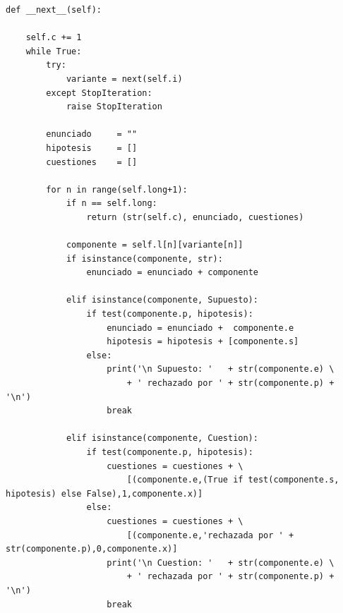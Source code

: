 \documentclass[10pt,a4paper]{report}
\begin{document}
\begin{verbatim}
def __next__(self):
    
    self.c += 1
    while True:
        try:
            variante = next(self.i)
        except StopIteration:
            raise StopIteration

        enunciado     = ""
        hipotesis     = []
        cuestiones    = []
                     
        for n in range(self.long+1):
            if n == self.long:
                return (str(self.c), enunciado, cuestiones)
    
            componente = self.l[n][variante[n]]
            if isinstance(componente, str):
                enunciado = enunciado + componente
                
            elif isinstance(componente, Supuesto):
                if test(componente.p, hipotesis):
                    enunciado = enunciado +  componente.e
                    hipotesis = hipotesis + [componente.s]
                else:
                    print('\n Supuesto: '   + str(componente.e) \
                        + ' rechazado por ' + str(componente.p) + '\n')
                    break
                
            elif isinstance(componente, Cuestion):
                if test(componente.p, hipotesis):
                    cuestiones = cuestiones + \
                        [(componente.e,(True if test(componente.s, hipotesis) else False),1,componente.x)]
                else:
                    cuestiones = cuestiones + \
                        [(componente.e,'rechazada por ' + str(componente.p),0,componente.x)]
                    print('\n Cuestion: '   + str(componente.e) \
                        + ' rechazada por ' + str(componente.p) + '\n')
                    break
\end{verbatim}
\end{document}
